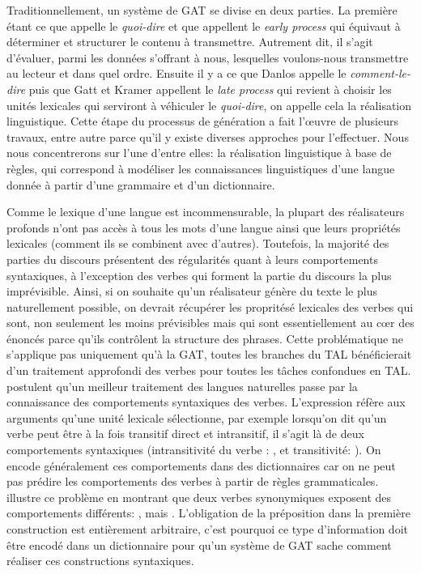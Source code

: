 Traditionnellement, un système de \ac{GAT} se divise en deux parties. La première étant ce que \cite{DanlosPresentationmodelegeneration1983} appelle le \emph{quoi-dire} et que \cite{gatt18} appellent le \emph{early process} qui équivaut à déterminer et structurer le contenu à transmettre. Autrement dit, il s'agit d'évaluer, parmi les données s'offrant à nous, lesquelles voulons-nous transmettre au lecteur et dans quel ordre. Ensuite il y a ce que Danlos appelle le \emph{comment-le-dire} puis que Gatt et Kramer appellent le \emph{late process} qui revient à choisir les unités lexicales qui serviront à véhiculer le \emph{quoi-dire}, on appelle cela la réalisation linguistique. Cette étape du processus de génération a fait l'\oe{}uvre de plusieurs travaux, entre autre parce qu'il y existe diverses approches pour l'effectuer. Nous nous concentrerons sur l'une d'entre elles: la réalisation linguistique à base de règles, qui correspond à modéliser les connaissances linguistiques d'une langue donnée à partir d'une grammaire et d'un dictionnaire.

Comme le lexique d'une langue est incommensurable, la plupart des réalisateurs profonds n'ont pas accès à tous les mots d'une langue ainsi que leurs propriétés lexicales (comment ils se combinent avec d'autres). Toutefois, la majorité des parties du discours présentent des régularités quant à leurs comportements syntaxiques, à l'exception des verbes qui forment la partie du discours la plus imprévisible. Ainsi, si on souhaite qu'un réalisateur génère du texte le plus naturellement possible, on devrait récupérer les propritésé lexicales des verbes qui sont, non seulement les moins prévisibles mais qui sont essentiellement au c\oe{}r des énoncés parce qu'ils contrôlent la structure des phrases. Cette problématique ne s'applique pas uniquement qu'à la \ac{GAT}, toutes les branches du \ac{TAL} bénéficierait d'un traitement approfondi des verbes pour toutes les tâches confondues en \ac{TAL}. \cite{SchulerVerbnetBroadcoverageComprehensive2005,Korhonenlargesubcategorizationlexicon2006} postulent qu'un meilleur traitement des langues naturelles passe par la connaissance des comportements syntaxiques des verbes. L'expression  réfère aux arguments qu'une unité lexicale sélectionne, par exemple lorsqu'on dit qu'un verbe peut être à la fois transitif direct et intransitif, il s'agit là de deux comportements syntaxiques (intransitivité du verbe : , et transitivité: ). On encode généralement ces comportements dans des dictionnaires car on ne peut pas prédire les comportements des verbes à partir de règles grammaticales. \cite{MilicevicSchemaregimepont2009} illustre ce problème en montrant que deux verbes synonymiques exposent des comportements différents: , mais . L'obligation de la préposition dans la première construction est entièrement arbitraire, c'est pourquoi ce type d'information doit être encodé dans un dictionnaire pour qu'un système de \ac{GAT} sache comment réaliser ces constructions syntaxiques.

